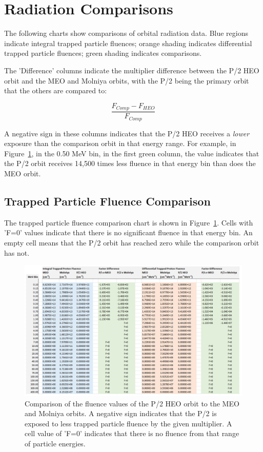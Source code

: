 \documentclass[11pt]{article}
\begin{document}
\section{Radiation Comparisons}
The following charts show comparisons of orbital radiation data. Blue regions indicate integral trapped particle fluences; orange shading indicates differential trapped particle fluences; green shading indicates comparisons. 

The 'Difference' columns indicate the multiplier difference between the P/2 HEO orbit and the MEO and Molniya orbits, with the P/2 being the primary orbit that the others are compared to:

\[ \frac{F_{Comp} - F_{HEO}}{F_{Comp}} \]

A negative sign in these columns indicates that the P/2 HEO receives a \textit{lower} exposure than the comparison orbit in that energy range. For example, in Figure~\ref{fig:COMPTrapped}, in the 0.50 MeV bin, in the first green column, the value indicates that the P/2 orbit receives 14,500 times less fluence in that energy bin than does the MEO orbit. 

\subsection{Trapped Particle Fluence Comparison}

The trapped particle fluence comparison chart is shown in Figure~\ref{fig:COMPTrapped}. Cells with 'F=0' values indicate that there is no significant fluence in that energy bin. An empty cell means that the P/2 orbit has reached zero while the comparison orbit has not.

\begin{figure}[!t]
    \centering
        \includegraphics[width=1\linewidth]{COMP_Trapped.png}
        \caption{Comparison of the fluence values of the P/2 HEO orbit to the MEO and Molniya orbits. A negative sign indicates that the P/2 is exposed to less trapped particle fluence by the given multiplier. A cell value of 'F=0' indicates that there is no fluence from that range of particle energies.}
        \label{fig:COMPTrapped}
\end{figure}
\end{document}
